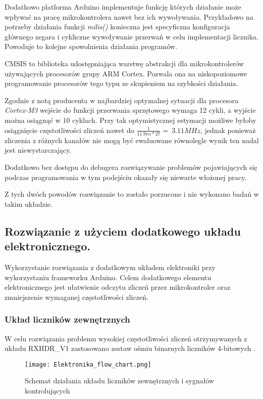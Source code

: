 Dodatkowo platforma Arduino implementuje funkcję których działanie może wpływać na pracę mikrokontrolera nawet bez ich wywoływania. 
Przykładowo na potrzeby działania funkcji \textit{milis()} konieczna jest specyficzna konfiguracja głównego zegara i cykliczne wywoływanie przerwań w celu implementacji licznika. Powoduje to kolejne spowolnienia działania programów. 


CMSIS to biblioteka udostępniająca warstwę abstrakcji dla mikrokontrolerów używających procesorów grupy ARM Cortex. 
Pozwala ona na niskopoziomowe programowanie procesorów tego typu ze skupieniem na szybkości działania.

Zgodnie z notą producenta \cite{interupt latency} w najbardziej optymalnej sytuacji dla procesora \textit{Cortex-M3} wejście do funkcji przerwania sprzętowego wymaga 12 cykli, a wyjście można osiągnąć w 10 cyklach. 
Przy tak optymistycznej estymacji możliwe byłoby osiągnięcie częstotliwości zliczeń nawet do $\frac{1}{11.9ns*27} = ~ 3.11 MHz$, jednak ponieważ zliczenia z różnych kanałów nie mogą być ewaluowane równolegle wynik ten nadal jest niewystarczający. 

Dodatkowo bez dostępu do debugera rozwiązywanie problemów pojawiających się podczas programowania w tym podejściu okazały się niewarte włożonej pracy. 

Z tych dwóch powodów rozwiązanie to zostało porzucone i nie wykonano badań w takim układzie. 

\subsection{Rozwiązanie z użyciem dodatkowego układu elektronicznego.}

Wykorzystanie rozwiązania z dodatkowym układem elektroniki przy wykorzystaniu frameworku Arduino. Celem dodatkowego elementu elektronicznego jest ułatwienie odczytu zliczeń przez mikrokontroler oraz zmniejszenie wymaganej częstotliwości zliczeń. 

\subsubsection{Układ liczników zewnętrznych}
\label{section licziki}

W celu rozwiązania problemu wysokiej częstotliwości zliczeń otrzymywanych z układu RXHDR\_V1 \cite{master} zastosowano zestaw ośmiu binarnych liczników 4-bitowych \cite{licznik doc}. 


\begin{figure}[]
        \centering
        \texttt{[image: Elektronika\_flow\_chart.png]}
        \caption{Schemat działania układu liczników zewnętrznych i sygnałów kontrolujących}
        \label{licznik flowchart}
\end{figure}

